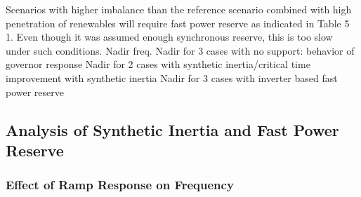 Scenarios with higher imbalance than the reference scenario combined with high penetration of renewables will require fast power reserve as indicated in Table 5 1. Even though it was assumed enough synchronous reserve, this is too slow under such conditions.
Nadir freq.
Nadir for 3 cases with no support: behavior of governor response
Nadir for 2 cases with synthetic inertia/critical time improvement with synthetic inertia
Nadir for 3 cases with inverter based fast power reserve
\subsection{Analysis of Synthetic Inertia and Fast Power Reserve}
\subsubsection{Effect of Ramp Response on Frequency}

